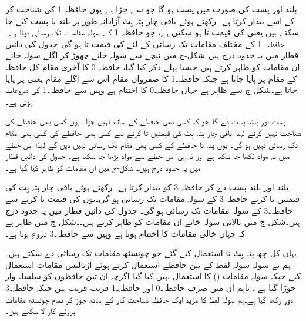 بلند   اور پست   کی صورت میں   پست ہو گا جو   سے  جڑا ہے۔یوں    حافظہ۔1 کی شناخت  کر کے اسے   بیدار کرتا ہے۔  رکھتے ہوئے  باقی چار پتہ  بِٹ آزادانہ طور پر بلند یا پست  کیے جا سکتے ہیں یعنی  کی قیمت   تا  ہو سکتی  ہے، جو حافظہ۔1 کے سولہ مقامات تک رسائی  دیتا ہے۔حافظہ -1 کے مختلف مقامات تک رسائی  کے لئے   کی  قیمت   تا  ہو گی۔جدول کی دائیں قطار میں یہ حدود درج ہیں۔شکل-ج میں نیچے سے سولہ خانے  چھوڑ کر  اگلے سولہ خانے ان مقامات کو ظاہر کرتے ہیں۔جیسا پہلے ذکر کیا گیا، حافظہ۔0 کا آخری مقام کل حافظہ کے مقام  پر پایا جاتا ہے جبکہ حافظہ۔1 کا صفرواں مقام اس سے اگلے  مقام یعنی    پر پایا جاتا ہے۔شکل-ج سے ظاہر ہے جہاں حافظہ۔0 کا اختتام ہے وہیں سے حافظہ۔1  کی شروعات ہوتی ہے۔

پست   اور بلند    پست    دے گا   جو کہ کسی بھی حافظے کے ساتھ نہیں جڑا۔ یوں  کسی بھی حافظے کی شناخت نہیں  کرتے لہٰذا باقی چار پتہ بِٹ کی قیمتیں  تا   کرنے سے  کسی بھی حافظے کی کسی بھی مقام تک رسائی نہیں ہو گی۔  یوں  پتہ  تا   حافظے کے کسی بھی مقام تک رسائی نہیں دیں گے لہٰذا اس خطے میں نہ مواد لکھا جا سکتا ہے اور نہ ہی  اس خطے سے مواد پڑھا جا سکتا ہے۔ جدول کی دائیں قطار میں یہ حدود درج ہیں۔ شکل-ج میں ان مقامات کو ظاہر کیا گیا ہے۔

بلند   اور بلند  پست    دے کر حافظہ۔3  کو بیدار کرتا ہے۔  رکھتے ہوئے  باقی  چار پتہ بِٹ  کی قیمتیں  تا  کرنے    حافظہ-3 کے سولہ مقامات تک رسائی ہو گی۔یوں  کی قیمت  تا  کرنے سے   حافظہ۔3 کے سولہ مقامات تک رسائی  ہو گی۔ جدول کی دائیں قطار میں یہ حدود درج ہیں۔شکل-ج میں  بالائی سولہ خانے ان  مقامات کو ظاہر کرتے ہیں۔۔شکل-ج  میں  ظاہر ہے کہ جہاں خالی مقامات کا اختتام ہوتا ہے وہیں سے حافظہ۔3  شروع ہوتا ہے۔

یہاں کل  چھ پتہ بِٹ  تا   استعمال کیے گئے جو  چونسٹھ   مقامات تک رسائی دے سکتے ہیں۔ہم نے سولہ سولہ لفظ کے تین حافظے استعمال کرتے ہوئے  اڑتالیس  مقامات استعمال کیے جبکہ سولہ   مقامات ()   کا استعمال نہیں کیا گیا۔اگرچہ ان تین حافظوں کو سلسلہ وار جوڑا گیا ہے ، تاہم  ان میں صرف حافظہ۔0 اور حافظہ۔1 قریب قریب    ہیں جبکہ حافظہ۔3  دور رکھا گیا ہے۔ہم سولہ لفظ کا   مزید ایک حافظہ  شناخت کار کے  ساتھ جوڑ کر تمام چونسٹھ مقامات بروئے کار لا سکتے ہیں۔




